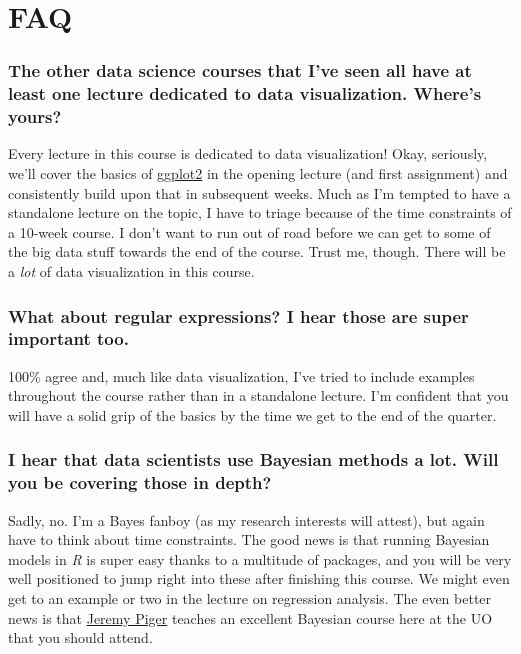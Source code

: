 \documentclass[12]{article}
\begin{document}
\newpage
\section*{FAQ}

\vspace{-0.25cm}
\subsubsection*{The other data science courses that I've seen all have at least one lecture dedicated to data visualization. Where's yours?}
Every lecture in this course is dedicated to data visualization! Okay, seriously, we'll cover the basics of \href{https://ggplot2.tidyverse.org/}{ggplot2} in the opening lecture (and first assignment) and consistently build upon that in subsequent weeks. Much as I'm tempted to have a standalone lecture on the topic, I have to triage because of the time constraints of a 10-week course. I don't want to run out of road before we can get to some of the big data stuff towards the end of the course. Trust me, though. There will be a \textit{lot} of data visualization in this course. 

\vspace{-0.25cm}
\subsubsection*{What about regular expressions? I hear those are super important too.}
100\% agree and, much like data visualization, I've tried to include examples throughout the course rather than in a standalone lecture. I'm confident that you will have a solid grip of the basics by the time we get to the end of the quarter.

\vspace{-0.25cm}
\subsubsection*{I hear that data scientists use Bayesian methods a lot. Will you be covering those in depth?}
Sadly, no. I'm a Bayes fanboy (as my research interests will attest), but again have to think about time constraints. The good news is that running Bayesian models in \textit{R} is super easy thanks to a multitude of packages, and you will be very well positioned to jump right into these after finishing this course. We might even get to an example or two in the lecture on regression analysis. The even better news is that \href{https://pages.uoregon.edu/jpiger/}{Jeremy Piger} teaches an excellent Bayesian course here at the UO that you should attend.
\end{document}
